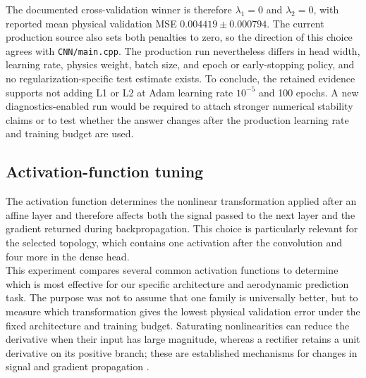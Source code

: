 The documented cross-validation winner is therefore $\lambda_1=0$ and $\lambda_2=0$, with reported mean physical validation MSE $0.004419\pm0.000794$. The current production source also sets both penalties to zero, so the direction of this choice agrees with \texttt{CNN/main.cpp}. The production run nevertheless differs in head width, learning rate, physics weight, batch size, and epoch or early-stopping policy, and no regularization-specific test estimate exists. To conclude, the retained evidence supports not adding L1 or L2 at Adam learning rate $10^{-5}$ and 100 epochs. A new diagnostics-enabled run would be required to attach stronger numerical stability claims or to test whether the answer changes after the production learning rate and training budget are used.

\subsection{Activation-function tuning}
\label{sec:04_activation_tuning}

The activation function determines the nonlinear transformation applied after an affine layer and therefore affects both the signal passed to the next layer and the gradient returned during backpropagation. This choice is particularly relevant for the selected topology, which contains one activation after the convolution and four more in the dense head.\\

This experiment compares several common activation functions to determine which is most effective for our specific architecture and aerodynamic prediction task. The purpose was not to assume that one family is universally better, but to measure which transformation gives the lowest physical validation error under the fixed architecture and training budget. Saturating nonlinearities can reduce the derivative when their input has large magnitude, whereas a rectifier retains a unit derivative on its positive branch; these are established mechanisms for changes in signal and gradient propagation \cite{glorot2010understanding}.\\

